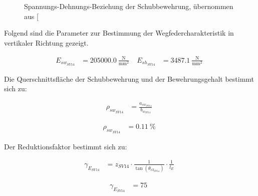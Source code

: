 \documentclass[
  11pt,
  letterpaper,
]{scrreprt}
\begin{document}
\begin{figure}[H]


\caption{\label{fig-sigma-epsilon-sv14}Spannungs-Dehnungs-Beziehung der
Schubbewehrung, übernommen aus
{[}\citeproc{ref-gitz_ansatze_2024}{1}{]}}

\end{figure}%

Folgend sind die Parameter zur Bestimmung der Wegfedercharakteristik in
vertikaler Richtung gezeigt.

$$
\begin{aligned}
E_{sw_{SV14}} &= 205000.0\ \frac{\mathrm{N}}{\mathrm{mm}^{2}} \; 
 &E_{sh_{SV14}} &= 3487.1\ \frac{\mathrm{N}}{\mathrm{mm}^{2}} \;
\end{aligned}
$$

Die Querschnittsfläche der Schubbewehrung und der Bewehrungsgehalt
bestimmt sich zu:

$$
\begin{aligned}
\rho_{sw_{SV14}} &= \frac{ a_{sw_{SV14}} }{ b_{w_{SV14}} } \; 
\end{aligned}
$$

$$
\begin{aligned}
\rho_{sw_{SV14}} &= 0.11\ \mathrm{\%} \;
\end{aligned}
$$

Der Reduktionsfaktor bestimmt sich zu:

$$
\begin{aligned}
\gamma_{E_{SV14}} &= z_{SV14} \cdot \frac{ 1 }{ \tan \left( \theta_{c3_{SV14}} \right) } \cdot \frac{1} { l_{E} } \; 
\end{aligned}
$$

$$
\begin{aligned}
\gamma_{E_{SV14}} &= 75\ \;
\end{aligned}
$$
\end{document}

